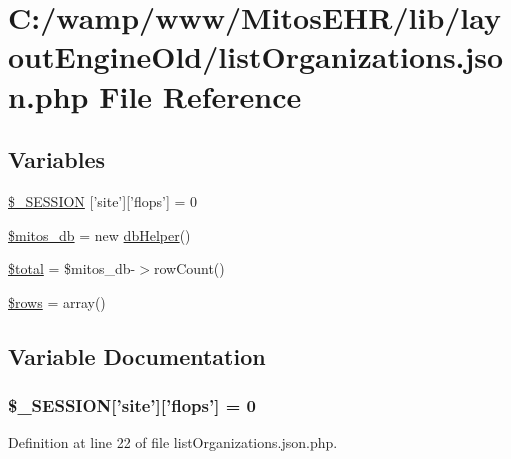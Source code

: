 \hypertarget{list_organizations_8json_8php}{\section{\-C\-:/wamp/www/\-Mitos\-E\-H\-R/lib/layout\-Engine\-Old/list\-Organizations.json.\-php \-File \-Reference}
\label{list_organizations_8json_8php}
}
\subsection*{\-Variables}
\begin{DoxyCompactItemize}
\item 
\hyperlink{list_organizations_8json_8php_a99fda8552a3e58235643b79f5af3ded8}{\$\-\_\-\-S\-E\-S\-S\-I\-O\-N} \mbox{[}'site'\mbox{]}\mbox{[}'flops'\mbox{]} = 0
\item 
\hyperlink{list_organizations_8json_8php_ab5d961f93efe4e2e8d8374f01dd6c65a}{\$mitos\-\_\-db} = new \hyperlink{classdb_helper}{db\-Helper}()
\item 
\hyperlink{list_organizations_8json_8php_a241b818f48030b628685b2e5119c5624}{\$total} = \$mitos\-\_\-db-\/$>$row\-Count()
\item 
\hyperlink{list_organizations_8json_8php_ace2ec39e7df3899fa8df9640ec274b03}{\$rows} = array()
\end{DoxyCompactItemize}


\subsection{\-Variable \-Documentation}
\hypertarget{list_organizations_8json_8php_a99fda8552a3e58235643b79f5af3ded8}{
\subsubsection[{\$\-\_\-\-S\-E\-S\-S\-I\-O\-N}]{\setlength{\rightskip}{0pt plus 5cm}\$\-\_\-\-S\-E\-S\-S\-I\-O\-N\mbox{[}'site'\mbox{]}\mbox{[}'flops'\mbox{]} = 0}}\label{list_organizations_8json_8php_a99fda8552a3e58235643b79f5af3ded8}


\-Definition at line 22 of file list\-Organizations.\-json.\-php.

